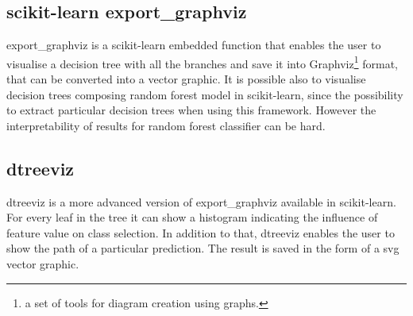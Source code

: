 \subsection{scikit-learn export\_graphviz}
export\_graphviz is a scikit-learn embedded function that enables the user to visualise a decision tree with all the branches and save it into Graphviz\footnote{a set of tools for diagram creation using graphs.} format, that can be converted into a vector graphic. It is possible also to visualise decision trees composing random forest model in scikit-learn, since the possibility to extract particular decision trees when using this framework. However the interpretability of results for random forest classifier can be hard.

\subsection{dtreeviz}
dtreeviz is a more advanced version of export\_graphviz available in scikit-learn. For every leaf in the tree it can show a histogram indicating the influence of feature value on class selection. In addition to that, dtreeviz enables the user to show the path of a particular prediction. The result is saved in the form of a svg vector graphic. 




